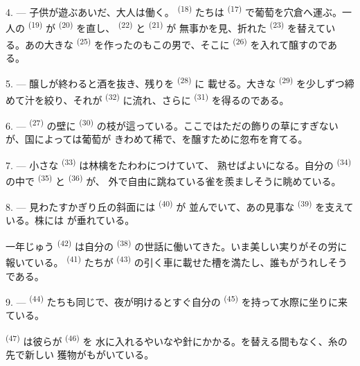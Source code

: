 4. --- 子供が遊ぶあいだ、大人は働く。 \textsuperscript{(18)}
たちは \textsuperscript{(17)} で葡萄を穴倉へ運ぶ。一人の
 \textsuperscript{(19)} が \textsuperscript{(20)} を直し、
 \textsuperscript{(22)} と \textsuperscript{(21)} が
無事かを見、折れた \textsuperscript{(23)} を替えている。あの大きな
 \textsuperscript{(25)} を作ったのもこの男で、そこに
\textsuperscript{(26)} を入れて醸すのである。

5. --- 醸しが終わると酒を抜き、残りを \textsuperscript{(28)} に
載せる。大きな \textsuperscript{(29)} を少しずつ締めて汁を絞り、それが
 \textsuperscript{(32)} に流れ、さらに \textsuperscript{(31)}
を得るのである。

\VUsaut{6.0mm}
\VUsaut{3.4mm}

6. ---  \textsuperscript{(27)} の壁に \textsuperscript{(30)}
の枝が這っている。ここではただの飾りの草にすぎないが、国によっては葡萄が
きわめて稀で、を醸すために忽布を育てる。

7. --- 小さな \textsuperscript{(33)} は林檎をたわわにつけていて、
熟せばよいになる。自分の \textsuperscript{(34)} の中で
 \textsuperscript{(35)} と \textsuperscript{(36)} が、
外で自由に跳ねている雀を羨ましそうに眺めている。

8. --- 見わたすかぎり丘の斜面には \textsuperscript{(40)} が
並んでいて、あの見事な \textsuperscript{(39)} を支えている。株には
が垂れている。

一年じゅう \textsuperscript{(42)} は自分の
\textsuperscript{(38)} の世話に働いてきた。いま美しい実りがその労に報いている。
 \textsuperscript{(41)} たちが \textsuperscript{(43)}
の引く車に載せた槽を満たし、誰もがうれしそうである。

\VUsaut{5.0mm}
\VUsaut{3.4mm}

9. ---  \textsuperscript{(44)} たちも同じで、夜が明けるとすぐ自分の
 \textsuperscript{(45)} を持って水際に坐りに来ている。

 \textsuperscript{(47)} は彼らが \textsuperscript{(46)} を
水に入れるやいなや針にかかる。を替える間もなく、糸の先で新しい
獲物がもがいている。

